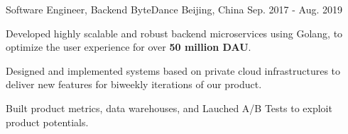 
\begin{cventries}

  \cventry
    {Software Engineer, Backend} %
    {ByteDance} %
    {Beijing, China} %
    {Sep. 2017 - Aug. 2019} %
    {
      \begin{cvitems} 
        \item{Developed highly scalable and robust backend microservices using Golang, to optimize the user experience for over \textbf{50 million DAU}.}
        \item {Designed and implemented systems based on private cloud infrastructures to deliver new features for biweekly iterations of our product.}  
        \item {Built product metrics, data warehouses, and Lauched A/B Tests to exploit product potentials.}
      \end{cvitems}
    }


\end{cventries}
